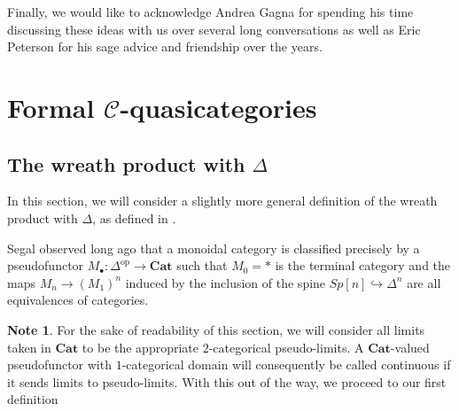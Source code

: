 \documentclass[a4paper]{article}
\numberwithin{equation}{subsection}
\theoremstyle{plain}   %
\theoremstyle{definition}
\newtheorem{note}[equation]{Note}
\theoremstyle{remark}
\theoremstyle{plain}
\newcommand{\op}{\ensuremath{\mathrm{op}}}
\newcommand{\Cat}{\ensuremath{\mathbf{Cat}}}
\providecommand{\C}{}
\renewcommand{\C}{\ensuremath{\mathcal{C}}}
\begin{document}
Finally, we would like to acknowledge Andrea Gagna for spending his time discussing these ideas with us over several long conversations as well as Eric Peterson for his sage advice and friendship over the years.  


\section{Formal \(\C\)-quasicategories}
\subsection{The wreath product with \(\Delta\)}
In this section, we will consider a slightly more general definition of the wreath product with \(\Delta\), as defined in \cite{oury}.  

Segal observed long ago that a monoidal category is classified precisely by a pseudofunctor \(M_\bullet:\Delta^\op\to \Cat\) such that \(M_0=\ast\) is the terminal category and the maps \(M_n \to {(M_1)}^n\) induced by the inclusion of the spine \(Sp[n]\hookrightarrow \Delta^n\) are all equivalences of categories.  

\begin{note}
	For the sake of readability of this section, we will consider all limits taken in \(\Cat\) to be the appropriate \(2\)-categorical pseudo-limits.  A \(\Cat\)-valued pseudofunctor with \(1\)-categorical domain will consequently be called continuous if it sends limits to pseudo-limits.  With this out of the way, we proceed to our first definition
\end{note}
\end{document}
